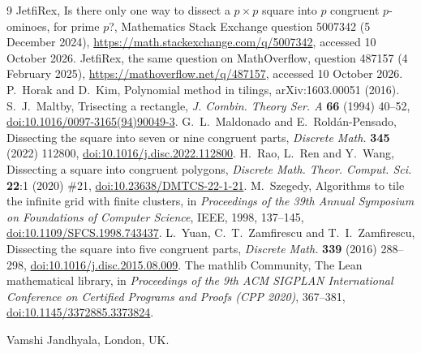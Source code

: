 \documentclass[11pt]{article}
\theoremstyle{remark}
\begin{document}
\begin{thebibliography}{9}
 JetfiRex, Is there only one way to dissect a $p\times p$ square into $p$ congruent $p$-ominoes, for
prime $p$?, Mathematics Stack Exchange question 5007342 (5 December 2024),
\url{https://math.stackexchange.com/q/5007342}, accessed 10 October 2026.
 JetfiRex, the same question on MathOverflow, question 487157 (4 February 2025),
\url{https://mathoverflow.net/q/487157}, accessed 10 October 2026.
 P.~Horak and D.~Kim, Polynomial method in tilings, arXiv:1603.00051 (2016).
 S.~J.~Maltby, Trisecting a rectangle, \emph{J. Combin. Theory Ser. A} \textbf{66} (1994) 40--52,
\href{https://doi.org/10.1016/0097-3165(94)90049-3}{doi:10.1016/0097-3165(94)90049-3}.
 G.~L.~Maldonado and E.~Rold\'an-Pensado, Dissecting the square into seven or nine congruent
parts, \emph{Discrete Math.} \textbf{345} (2022) 112800,
\href{https://doi.org/10.1016/j.disc.2022.112800}{doi:10.1016/j.disc.2022.112800}.
 H.~Rao, L.~Ren and Y.~Wang, Dissecting a square into congruent polygons, \emph{Discrete Math.
Theor. Comput. Sci.} \textbf{22}:1 (2020) \#21,
\href{https://doi.org/10.23638/DMTCS-22-1-21}{doi:10.23638/DMTCS-22-1-21}.
 M.~Szegedy, Algorithms to tile the infinite grid with finite clusters, in \emph{Proceedings of
the 39th Annual Symposium on Foundations of Computer Science}, IEEE, 1998, 137--145,
\href{https://doi.org/10.1109/SFCS.1998.743437}{doi:10.1109/SFCS.1998.743437}.
 L.~Yuan, C.~T.~Zamfirescu and T.~I.~Zamfirescu, Dissecting the square into five congruent parts,
\emph{Discrete Math.} \textbf{339} (2016) 288--298,
\href{https://doi.org/10.1016/j.disc.2015.08.009}{doi:10.1016/j.disc.2015.08.009}.
 The mathlib Community, The Lean mathematical library, in \emph{Proceedings of the 9th ACM
SIGPLAN International Conference on Certified Programs and Proofs (CPP 2020)}, 367--381,
\href{https://doi.org/10.1145/3372885.3373824}{doi:10.1145/3372885.3373824}.
\end{thebibliography}

\bigskip
\noindent Vamshi Jandhyala, London, UK.
\end{document}

